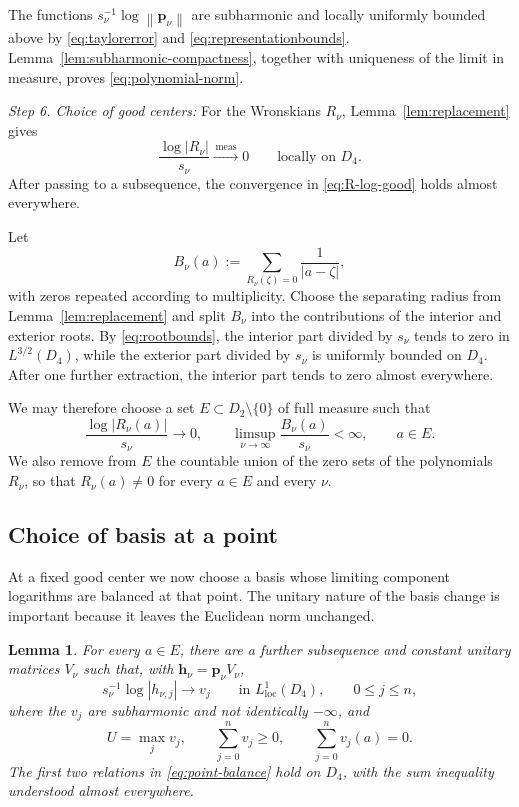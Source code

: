 \documentclass[12pt,letterpaper,reqno]{amsart}
\newtheorem{lem}[thm]{Lemma}
\theoremstyle{definition}
\numberwithin{equation}{section}
\newcommand{\loc}{\mathrm{loc}}
\newcommand{\norm}[1]{\left\lVert#1\right\rVert}
\newcommand{\convmeas}{\xrightarrow{\,\mathrm{meas}\,}}
\newcommand{\pv}{\bm p}
\newcommand{\hv}{\bm h}
\begin{document}
The functions \(s_\nu^{-1}\log\norm{\pv_\nu}\) are subharmonic and
locally uniformly bounded above by \eqref{eq:taylorerror} and
\eqref{eq:representationbounds}. Lemma~\ref{lem:subharmonic-compactness},
together with uniqueness of the limit in measure, proves
\eqref{eq:polynomial-norm}.


\medskip\noindent
\emph{{Step 6. Choice of good centers:}}
For the Wronskians \(R_\nu\), Lemma~\ref{lem:replacement} gives
\begin{equation}\label{eq:R-log-good}
 \frac{\log|R_\nu|}{s_\nu}
 \convmeas0
 \qquad\text{locally on }D_4.
\end{equation}
After passing to a subsequence, the convergence in
\eqref{eq:R-log-good} holds almost everywhere.

Let
\[
B_\nu(a)
:=
\sum_{R_\nu(\zeta)=0}\frac1{|a-\zeta|},
\]
with zeros repeated according to multiplicity.
Choose the separating radius from Lemma~\ref{lem:replacement} and split
\(B_\nu\) into the contributions of the interior and exterior
roots. By \eqref{eq:rootbounds}, the
interior part divided by \(s_\nu\) tends to zero in
\(L^{3/2}(D_4)\), while the exterior part divided by \(s_\nu\) is
uniformly bounded on \(D_4\). After one further extraction, the
interior part tends to zero almost everywhere.

We may therefore choose a set
\(E\subset D_2\setminus\{0\}\) of full measure such that
\begin{equation}\label{eq:good-centers}
 \frac{\log|R_\nu(a)|}{s_\nu}\longrightarrow0,
 \qquad
 \limsup_{\nu\to\infty}
 \frac{B_\nu(a)}{s_\nu}<\infty,
 \qquad
 a\in E.
\end{equation}
We also remove from \(E\) the countable union of the zero sets of the
polynomials \(R_\nu\), so that \(R_\nu(a)\ne0\) for every
\(a\in E\) and every \(\nu\).


\subsection{Choice of basis at a point}

At a fixed good center we now choose a basis whose limiting component
logarithms are balanced at that point. The unitary nature of the basis
change is important because it leaves the Euclidean norm unchanged.

\begin{lem}\label{lem:basis-at-point}
For every \(a\in E\), there are a further subsequence and constant
unitary matrices \(V_\nu\) such that, with
\(\hv_\nu=\pv_\nu V_\nu\),
\[
s_\nu^{-1}\log|h_{\nu,j}|
\longrightarrow v_j
\qquad\text{in }L^1_{\loc}(D_4),
\qquad
0\leq j\leq n,
\]
where the \(v_j\) are subharmonic and not identically \(-\infty\), and
\begin{equation}\label{eq:point-balance}
 U=\max_jv_j,
 \qquad
 \sum_{j=0}^{n}v_j\geq0,
 \qquad
 \sum_{j=0}^{n}v_j(a)=0.
\end{equation}
The first two relations in \eqref{eq:point-balance} hold on \(D_4\),
with the sum inequality understood almost everywhere.
\end{lem}
\end{document}
